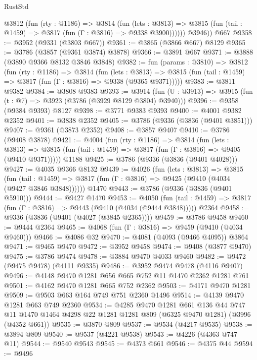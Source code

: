 \begin{lexlean}{RustStd}
\begin{coremodule}
          @3812
            (fun (rty : @1186) =>
            @3814
              (fun (lets : @3813) =>
              @3815 (fun (tail : @1459) => @3817 (fun (Γ : @3816) => @9338 @3900))))))
        @3946))
    @667
@9358 := @3952 (@9331 (@3803 @667))
@9361 := @3865 (@3866 @667) @8129
@9365 := @3786 (@3857 (@9361 @3874) @3878)
@9366 := @3891 @667
@9371 := @3888 (@3890 @9366 @8132 @3846 @3848)
@9382 := fun (params : @3810) =>
  @3812
    (fun (rty : @1186) =>
    @3814
      (fun (lets : @3813) =>
      @3815 (fun (tail : @1459) => @3817 (fun (Γ : @3816) => @9338 (@9365 @9371)))))
@9383 := @3811 @9382
@9384 := @3808 @9383
@9393 := @3914 (fun (U : @3913) => @3915 (fun (t : @7) => @3923 (@3786 (@3929 @8129 @3804) @3940)))
@9396 := @9358 (@9384 @9393) @8127
@9398 := @3771 @9383 @9393
@9400 := @4001 @9382 @2352
@9401 := @3838 @2352
@9405 := @3786 (@9336 (@3836 (@9401 @3851)))
@9407 := @9361 (@3873 @2352)
@9408 := @3857 @9407
@9410 := @3786 (@9408 @3878)
@9421 := @4004
    (fun (rty : @1186) =>
    @3814
      (fun (lets : @3813) =>
      @3815 (fun (tail : @1459) => @3817 (fun (Γ : @3816) => @9405 (@9410 @9371)))))
    @1188
@9425 := @3786 (@9336 (@3836 (@9401 @4028)))
@9427 := @4035 @9366 @8132
@9439 := @4026
    (fun (lets : @3813) =>
    @3815
      (fun (tail : @1459) => @3817 (fun (Γ : @3816) => @9425 (@9410 (@4034 (@9427 @3846 @3848))))))
    @1470
@9443 := @3786 (@9336 (@3836 (@9401 @5910)))
@9444 := @9427 @1470
@9453 := @4050
    (fun (tail : @1459) => @3817 (fun (Γ : @3816) => @9443 (@9410 (@4034 (@9444 @3848)))))
    @2364
@9458 := @9336 (@3836 (@9401 (@4027 (@3845 @2365))))
@9459 := @3786 @9458
@9460 := @9444 @2364
@9465 := @4068 (fun (Γ : @3816) => @9459 (@9410 (@4034 @9460)))
@9466 := @4086 @32
@9470 := @4081 (@4093 (@9466 @4095)) @3864
@9471 := @9465 @9470
@9472 := @3952 @9458
@9474 := @9408 (@3877 @9470)
@9475 := @3786 @9474
@9478 := @3884 @9470 @4033 @9460
@9482 := @9472 (@9475 @9478) (@4111 @9335)
@9486 := @3952 @9474 @9478 (@4116 @9407)
@9496 := @4148 @9470 @1281 @656 @665 @752 @11 @1470 @2362 @1281 @761
@9501 := @4162 @9470 @1281 @665 @752 @2362
@9503 := @4171 @9470 @1281
@9509 := @9503 @663 @164 @749 @751 @2360 @1496
@9514 := @4139 @9470 @1281 @663 @749 @2360
@9534 := @4285
    @9470
    @1281
    @661
    @136
    @44
    @747
    @11
    @1470
    @1464
    @4298
    @22
    @1281
    @1281
    @809
    (@6325 @9470 @1281)
    (@3996 (@4352 @661))
@9535 := @3870 @809
@9537 := @9534 (@4217 @9535)
@9538 := @3894 @809
@9540 := @9537 (@4221 @9538)
@9543 := @4226 (@4363 @747 @11)
@9544 := @9540 @9543
@9545 := @4373 @661
@9546 := @4375 @44
@9594 := @9496

\end{coremodule}
\end{lexlean}

